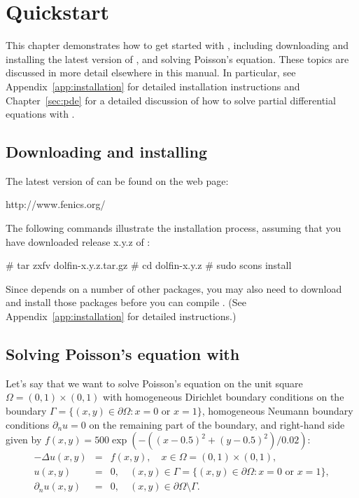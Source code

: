 \chapter{Quickstart}
\label{chap:quickstart}

This chapter demonstrates how to get started with \dolfin{}, including
downloading and installing the latest version of \dolfin{}, and solving
Poisson's equation. These topics are discussed in more detail
elsewhere in this manual. In particular, see
Appendix~\ref{app:installation} for detailed installation instructions
and Chapter~\ref{sec:pde} for a detailed discussion of how to solve
partial differential equations with \dolfin{}.

\section{Downloading and installing \dolfin{}}

The latest version of \dolfin{} can be found on the \fenics{} web page:
\begin{code}
http://www.fenics.org/
\end{code}
The following commands illustrate the installation process, assuming
that you have downloaded release x.y.z of \dolfin{}:
\begin{code}
# tar zxfv dolfin-x.y.z.tar.gz
# cd dolfin-x.y.z
# sudo scons install
\end{code}

Since \dolfin{} depends on a number of other packages, you may also
need to download and install those packages before you can compile
\dolfin{}. (See Appendix~\ref{app:installation} for detailed
instructions.)

\section{Solving Poisson's equation with \dolfin{}}

Let's say that we want to solve Poisson's equation on the unit square
$\Omega = (0,1) \times (0,1)$ with homogeneous Dirichlet boundary
conditions on the boundary $\Gamma = \{(x, y) \in \partial \Omega : x = 0 \mbox{ or } x = 1\}$,
homogeneous Neumann boundary conditions $\partial_n u = 0$ on the remaining part of the boundary,
and right-hand side given by $f(x, y) = 500 \exp(-((x-0.5)^2 + (y-0.5)^2)/0.02)$:
\begin{eqnarray} \label{eq:poisson,quickstart}
  - \Delta u(x, y) &=& f(x, y), \quad
  x \in \Omega = (0,1) \times (0,1), \\
  u(x, y) &=& 0, \quad
  (x, y) \in \Gamma = \{(x, y) \in \partial \Omega : x = 0 \mbox{ or } x = 1\}, \\
  \partial_n u(x, y) &=& 0, \quad
  (x, y) \in \partial \Omega \setminus \Gamma.
\end{eqnarray}

